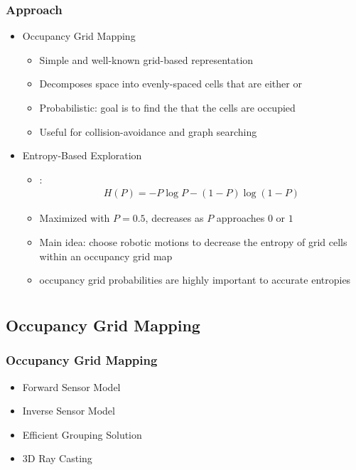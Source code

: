 \documentclass[11pt,professionalfonts,hyperref={pdftex,pdfpagemode=none,pdfstartview=FitH}]{beamer}
\renewcommand{\emph}[1]{\textit{\textbf{\color{blue}{#1}}}}
\begin{document}
\begin{frame}
\frametitle{Approach}
\begin{itemize}
    \item Occupancy Grid Mapping
    \begin{itemize}
    	\item Simple and well-known grid-based representation
	\item Decomposes space into evenly-spaced cells that are either \emph{occupied} or \emph{free}
    	\item Probabilistic: goal is to find the \emph{probability} that the cells are occupied
	\item Useful for collision-avoidance and graph searching
    \end{itemize}
\vspace*{0.0cm}\pause
\item Entropy-Based Exploration
\begin{itemize}
	\item \emph{Shannon's entropy}: \begin{align*}H(P)=-P\log{P}-(1-P)\log{(1-P)}\end{align*}
	\item Maximized with $P=0.5$, decreases as $P$ approaches $0$ or $1$
	\item Main idea: choose robotic motions to decrease the entropy of grid cells within an occupancy grid map
	\item \emph{Accurate} occupancy grid probabilities are highly important to accurate entropies
\end{itemize}
\end{itemize}

\end{frame}

\section*{}
\subsection*{Occupancy Grid Mapping}

\begin{frame}
\frametitle{Occupancy Grid Mapping}
\begin{itemize}
	\item Forward Sensor Model
	\vspace*{1cm}
	\item Inverse Sensor Model
	\vspace*{1cm}
	\item Efficient Grouping Solution
	\vspace*{1cm}
	\item 3D Ray Casting
\end{itemize}

\end{frame}
\end{document}
